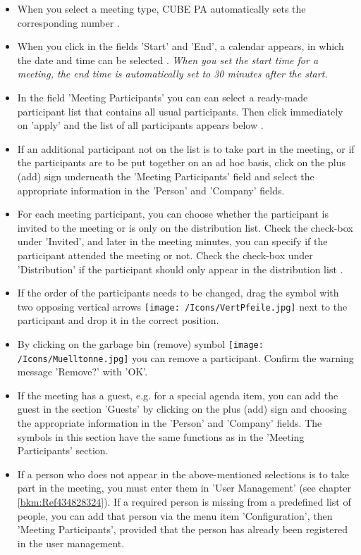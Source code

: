 \begin{itemize}
\item 
When you select a meeting type, CUBE PA automatically sets the corresponding number .
\item 
When you click in the fields 'Start' and 'End', a calendar appears, in which the date and time can be selected . \textit{When you set the start time for a meeting, the end time is automatically set to 30 minutes after the start.}
\item 
In the field 'Meeting Participants' you can can select a ready-made participant list  that contains all usual participants. Then click immediately on 'apply'  and the list of all participants appears below .
\item 
If an additional participant not on the list is to take part in the meeting, or if the participants are to be put together on an ad hoc basis, click on the plus (add) sign  underneath the 'Meeting Participants' field and select the appropriate information in the 'Person' and 'Company' fields. 
\item
For each meeting participant, you can choose whether the participant is invited to the meeting or is only on the distribution list. Check the check-box  under 'Invited', and later in the meeting minutes, you can specify if the participant attended the meeting or not. Check the check-box under 'Distribution' if the participant should only appear in the distribution list .
\item 
If the order of the participants needs to be changed, drag the symbol with two opposing vertical arrows \texttt{[image: /Icons/VertPfeile.jpg]}  next to the participant and drop it in the correct position.
\item 
By clicking on the garbage bin (remove) symbol \texttt{[image: /Icons/Muelltonne.jpg]}  you can remove a participant. Confirm the warning message 'Remove?' with 'OK'.
\item 
If the meeting has a guest, e.g. for a special agenda item, you can add the guest in the section 'Guests' by clicking on the plus (add) sign and choosing the appropriate information in the 'Person' and 'Company' fields. The symbols in this section have the same functions as in the 'Meeting Participants' section.
\item 
If a person who does not appear in the above-mentioned selections is to take part in the meeting, you must enter them in 'User Management' (see chapter \ref{bkm:Ref434828324}). If a required person is missing from a predefined list of people, you can add that person via the menu item 'Configuration', then 'Meeting Participants', provided that the person has already been registered in the user management.
\end{itemize}

